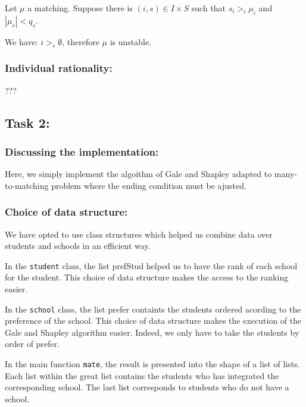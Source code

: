 \documentclass[11pt]{article}
\def\gt{>}
\begin{document}
Let \(\mu\) a matching. Suppose there is \((i, s) \in I \times S\) such
that \(s_{i} \gt _{i} \mu_{i}\) and \(|\mu_{s}| < q_{s}\).

We have: \(i >_{s} \emptyset\), therefore \(\mu\) is unstable.

\hypertarget{individual-rationality}{%
\subsubsection{Individual rationality:}\label{individual-rationality}}

???

    \hypertarget{task-2}{%
\subsection{Task 2:}\label{task-2}}

    \hypertarget{discussing-the-implementation}{%
\subsubsection{Discussing the
implementation:}\label{discussing-the-implementation}}

Here, we simply implement the algoithm of Gale and Shapley adapted to
many-to-matching problem where the ending condition must be ajusted.

    \hypertarget{choice-of-data-structure}{%
\subsubsection{Choice of data
structure:}\label{choice-of-data-structure}}

We have opted to use class structures which helped us combine data over
students and schools in an efficient way.

In the \texttt{student} class, the list prefStud helped us to have the
rank of each school for the student. This choice of data structure makes
the access to the ranking easier.

In the \texttt{school} class, the list prefer containts the students
ordered acording to the preference of the school. This choice of data
structure makes the execution of the Gale and Shapley algorithm easier.
Indeed, we only have to take the students by order of prefer.

In the main function \texttt{mate}, the result is presented into the
shape of a list of lists. Each list within the great list contains the
students who has integrated the corresponding school. The last list
corresponds to students who do not have a school.
\end{document}
